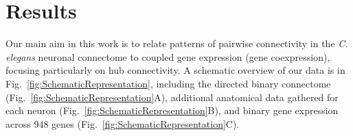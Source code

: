 \documentclass[10pt,letterpaper]{article}
\begin{document}




\section*{Results}
Our main aim in this work is to relate patterns of pairwise connectivity in the \emph{C. elegans} neuronal connectome to coupled gene expression (gene coexpression), focusing particularly on hub connectivity.
A schematic overview of our data is in Fig.~\ref{fig:SchematicRepresentation}, including
the directed binary connectome (Fig.~\ref{fig:SchematicRepresentation}A),
additional anatomical data gathered for each neuron (Fig.~\ref{fig:SchematicRepresentation}B),
and binary gene expression across 948 genes (Fig.~\ref{fig:SchematicRepresentation}C).
\end{document}

